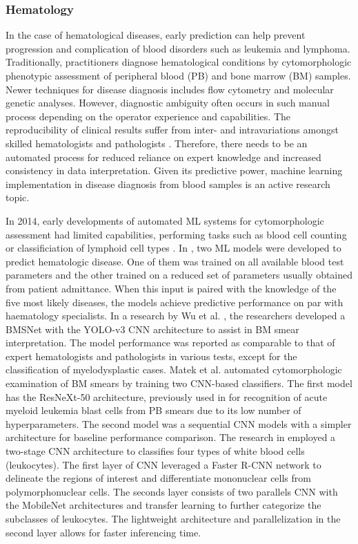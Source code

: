 \documentclass{article}
\begin{document}
\subsubsection{Hematology}
In the case of hematological diseases, early prediction can help prevent progression and complication of blood disorders such as leukemia and lymphoma. 
Traditionally, practitioners diagnose hematological conditions by cytomorphologic phenotypic assessment of peripheral blood (PB) and bone marrow (BM) samples.
Newer techniques for disease diagnosis includes flow cytometry and molecular genetic analyses. 
However, diagnostic ambiguity often occurs in such manual process depending on the operator experience and capabilities. 
The reproducibility of clinical results suffer from inter- and intravariations amongst skilled hematologists and pathologists \cite{walter_artificial_2023,wu_hematologist-level_2020}.
Therefore, there needs to be an automated process for reduced reliance on expert knowledge and increased consistency in data interpretation.
Given its predictive power, machine learning implementation in disease diagnosis from blood samples is an active research topic.

In 2014, early developments of automated ML systems for cytomorphologic assessment had limited capabilities, performing tasks such as blood cell counting or classificiation of lymphoid cell types \cite{alomari_automatic_2014,alferez_automatic_2014,alferez_automatic_2015}.
In \cite{guncar_application_2018}, two ML models were developed to predict hematologic disease.
One of them was trained on all available blood test parameters and the other trained on a reduced set of parameters usually obtained from patient admittance.
When this input is paired with the knowledge of the five most likely diseases, the models achieve predictive performance on par with haematology specialists.
In a research by Wu et al. \cite{wu_hematologist-level_2020}, the researchers developed a BMSNet with the YOLO-v3 CNN architecture to assist in BM smear interpretation.
The model performance was reported as comparable to that of expert hematologists and pathologists in various tests, except for the classification of myelodysplastic cases.
Matek et al. \cite{matek_highly_2021} automated cytomorphologic examination of BM smears by training two CNN-based classifiers. 
The first model has the ResNeXt-50 architecture, previously used in \cite{matek_human-level_2019} for recognition of acute myeloid leukemia blast cells from PB smears due to its low number of hyperparameters.
The second model was a sequential CNN models with a simpler architecture for baseline performance comparison.
The research in \cite{cheuque_efficient_2022} employed a two-stage CNN architecture to classifies four types of white blood cells (leukocytes).
The first layer of CNN leveraged a Faster R-CNN network to delineate the regions of interest and differentiate mononuclear cells from polymorphonuclear cells. 
The seconds layer consists of two parallels CNN with the MobileNet architectures and transfer learning to further categorize the subclasses of leukocytes. 
The lightweight architecture and parallelization in the second layer allows for faster inferencing time.
\end{document}
